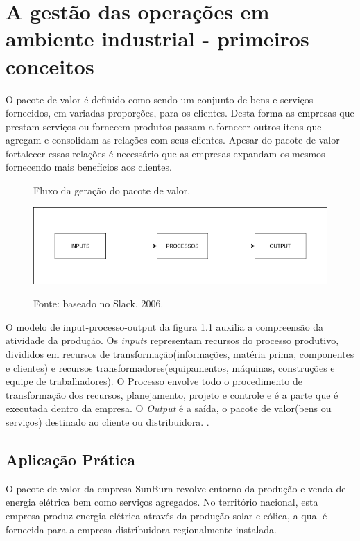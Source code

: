 \chapter{A gestão das operações em ambiente industrial - primeiros conceitos}
\label{chap:gestao_operacoes}

O pacote de valor é definido como sendo um conjunto de bens e serviços fornecidos, em variadas proporções, para os clientes. Desta forma as empresas que prestam serviços ou fornecem produtos passam a fornecer outros itens que agregam e consolidam as relações com seus clientes.
Apesar do pacote de valor fortalecer essas relações é necessário que as empresas expandam os mesmos fornecendo mais benefícios aos clientes.

\begin{figure}[H]
    \caption{Fluxo da geração do pacote de valor.}
    \includegraphics[width=\textwidth]{images/pacote_valor.png}
    \label{fig:pacotevalor}
    \caption*{Fonte: baseado no Slack, 2006.}

\end{figure}

O modelo de input-processo-output da figura \ref{fig:pacotevalor} auxilia a compreensão da atividade da produção. Os \textit{inputs} representam recursos do processo produtivo, divididos em recursos de transformação(informações, matéria prima, componentes e clientes) e recursos transformadores(equipamentos, máquinas, construções e equipe de trabalhadores). O Processo envolve todo o procedimento de transformação dos recursos, planejamento, projeto e controle e é a parte que é executada dentro da empresa. O \textit{Output} é a saída, o pacote de valor(bens ou serviços) destinado ao cliente ou distribuidora. \cite{slack2006administracao}.

\section{Aplicação Prática}
\label{sec:gestao_operacoes_aplicacao}
O pacote de valor da empresa SunBurn revolve entorno da produção e venda de energia elétrica bem como serviços agregados. No território nacional, esta empresa produz energia elétrica através da produção solar e eólica, a qual é fornecida para a empresa distribuidora regionalmente instalada. 

